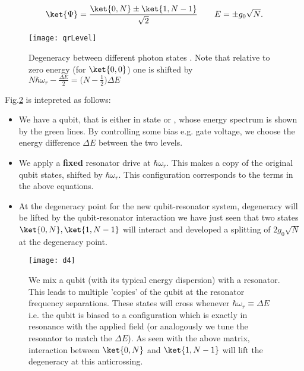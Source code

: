 \begin{equation}
  \ket{\Psi} = \frac{\ket{0,N}\pm\ket{1,N-1}}{\sqrt{2}} \qquad E = \pm{g_0\sqrt{N}}.
\end{equation}

\begin{figure}
  \centering
  \texttt{[image: qrLevel]}
  \caption{Degeneracy    between    different
    photon states \label{qrLevel}.  Note that
    relative    to     zero    energy    (for
    $   \ket{0,0}  $)   one  is   shifted  by
    $                  N\hbar\omega_r-\frac{\Delta
      E}{2}=\bigg(N-\frac{1}{2}\bigg)\Delta E $}
\end{figure}

Fig.\ref{qrDresssed}    is   intepreted    as
follows:

\begin{itemize}
\item  We have  a  qubit, that  is either  in
  state   or  , whose  energy
  spectrum is  shown by the green  lines.  By
  controlling some  bias e.g.   gate voltage,
  we    choose    the    energy    difference
  $ \Delta E $ between the two levels.
\item  We  apply a  \textbf{fixed}  resonator
  drive at  $ \hbar\omega_r $.  This  makes a
  copy of the  original qubit states, shifted
  by $  \hbar\omega_r $.   This configuration
  corresponds to the  terms in the
  above equations.
\item  At the  degeneracy point  for the  new
  qubit-resonator system,  degeneracy will be
  lifted  by the  qubit-resonator interaction
  \ira  we have  just  seen  that two  states
  $  \ket{0,N}, \ket{1,N-1}  $ will  interact
  and     developed     a    splitting     of
  $ 2g_0\sqrt{N}  $ at the  degeneracy point.
\end{itemize}

\begin{figure}[h]
  \centering%
  \texttt{[image: d4]}
  \caption{We mix  a qubit (with  its typical
    energy  dispersion)   with  a  resonator.
    This  leads to  multiple 'copies'  of the
    qubit   at    the   resonator   frequency
    separations.   These  states  will  cross
    whenever $  \hbar\omega_r\equiv\Delta E $
    i.e.    the   qubit   is  biased   to   a
    configuration   which   is   exactly   in
    resonance  with  the  applied  field  (or
    analogously  we  tune  the  resonator  to
    match the  $ \Delta  E $).   As seen  with the
    above    matrix,   interaction    between
    $\ket{0,N}$ and $ \ket{1,N-1} $ will lift
    the       degeneracy        at       this
    anticrossing.\label{qrDresssed}}
\end{figure}

